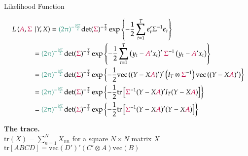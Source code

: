 \documentclass[notes,blackandwhite,mathsans,usenames,dvipsnames]{beamer}
\begin{document}
\begin{frame}{Likelihood Function}

\footnotesize
\begin{align*} 
L\left( {\color{purple}A},{\color{purple}\Sigma}\right.&\left.|Y,X \right) 
= {\color{mcxs2}(2\pi)^{-\frac{NT}{2}}}\text{det}({\color{purple}\Sigma})^{-\frac{T}{2}}\exp\left\{ -\frac{1}{2}\sum_{t=1}^{T}\epsilon_t' \Sigma^{-1} \epsilon_t  \right\}\\
&= {\color{mcxs2}(2\pi)^{-\frac{NT}{2}}}\text{det}({\color{purple}\Sigma})^{-\frac{T}{2}}\exp\left\{ -\frac{1}{2}\sum_{t=1}^{T}\left( y_t - {\color{purple}A}'x_t \right)' {\color{purple}\Sigma}^{-1} \left( y_t - {\color{purple}A}'x_t \right)  \right\}\\
&= {\color{mcxs2}(2\pi)^{-\frac{NT}{2}}}\text{det}({\color{purple}\Sigma})^{-\frac{T}{2}}\exp\left\{ -\frac{1}{2} \text{vec}\left( (Y-X{\color{purple}A})' \right)' \left(I_T\otimes {\color{purple}\Sigma}^{-1} \right) \text{vec}\left( (Y-X{\color{purple}A})' \right)  \right\}\\
&= {\color{mcxs2}(2\pi)^{-\frac{NT}{2}}}\text{det}({\color{purple}\Sigma})^{-\frac{T}{2}}\exp\left\{ -\frac{1}{2}\text{tr}\left[ {\color{purple}\Sigma}^{-1}(Y-X{\color{purple}A})'I_T(Y-X{\color{purple}A}) \right] \right\}\\
&= {\color{mcxs2}(2\pi)^{-\frac{NT}{2}}}\text{det}({\color{purple}\Sigma})^{-\frac{T}{2}}\exp\left\{ -\frac{1}{2}\text{tr}\left[ {\color{purple}\Sigma}^{-1}(Y-X{\color{purple}A})'(Y-X{\color{purple}A}) \right] \right\}
\end{align*}

\bigskip\textbf{The trace.}\\[1ex]
$\text{tr}(X) = \sum_{n=1}^{N}X_{nn}$ {\color{mcxs2}for a square} $N\times N$ {\color{mcxs2}matrix} $X$\\[1ex]
$ \text{tr}\left[ ABCD \right] = \text{vec}\left( D' \right)' \left( C' \otimes A \right) \text{vec}\left( B \right)$
 
\end{frame}
\end{document}
